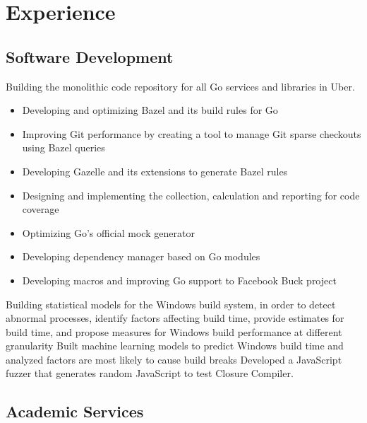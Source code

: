 \section{Experience}
\subsection{Software Development}
{Building the monolithic code repository for all Go services and libraries in Uber. 
	\begin{itemize}
		\item Developing and optimizing Bazel and its build rules for Go
		\item Improving Git performance by creating a tool  to manage Git sparse checkouts using Bazel queries
		\item Developing Gazelle and its extensions to generate Bazel rules
		\item Designing and implementing the collection, calculation and reporting for code coverage
		\item Optimizing Go's official mock generator
		\item Developing dependency manager based on Go modules
		\item Developing macros and improving Go support to Facebook Buck project
	\end{itemize}
}
{Building statistical models for the Windows build system, in order to detect abnormal processes, identify factors affecting build time, provide estimates for build time, and propose measures for Windows build performance at different granularity}
{Built machine learning models to predict Windows build time and analyzed factors are most likely to cause build breaks}
{Developed a JavaScript fuzzer that generates random JavaScript to test Closure Compiler.}

\subsection{Academic Services}

